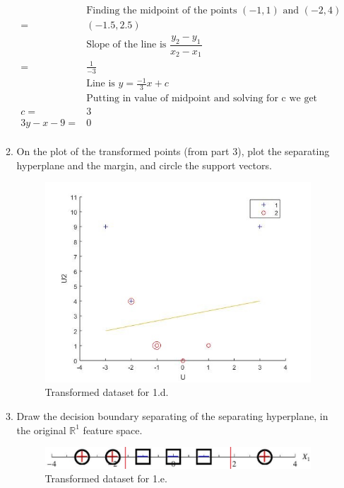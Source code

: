 \begin{enumerate}
\begin{enumerate}
\begin{align*}
	& \text{Finding the midpoint of the points } (-1 ,1) \text{ and } (-2 ,4) \\
	=& (-1.5 , 2.5) \\
	&\text{Slope of the line is } \dfrac{y_2 - y_1}{x_2 - x_1} \\
	=& \frac{1}{-3} \\
	& \text{Line is }y = \frac{-1}{3} x +c \\
	& \text{Putting in value of midpoint and solving for c we get} \\
	c =& 3 \\
	3y - x - 9 =& 0\\
\end{align*}
  
  \item {} On the plot of the transformed points (from part
    3), plot the separating hyperplane and the margin, and circle the
    support vectors.

\begin{figure}[H]
    \begin{center}
      \includegraphics[width=4in]{images/1_3.jpg}
    \end{center}
    \caption{Transformed dataset for 1.d.}
    \label{fig:1.b}
  \end{figure}

  \item {} Draw the decision boundary separating of the
    separating hyperplane, in the original $\mathbb{R}^1$ feature
    space.

\begin{figure}[H]
    \begin{center}
      \includegraphics[width=4in]{images/1_4.jpeg}
    \end{center}
    \caption{Transformed dataset for 1.e.}
    \label{fig:1.b}
  \end{figure}
  

\end{enumerate}
\end{enumerate}
